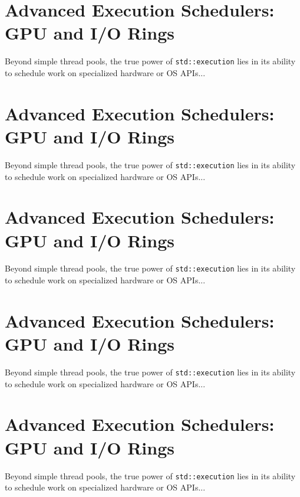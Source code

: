 \section{Advanced Execution Schedulers: GPU and I/O Rings}
Beyond simple thread pools, the true power of \texttt{std::execution} lies in its ability to schedule work on specialized hardware or OS APIs...

\section{Advanced Execution Schedulers: GPU and I/O Rings}
Beyond simple thread pools, the true power of \texttt{std::execution} lies in its ability to schedule work on specialized hardware or OS APIs...

\section{Advanced Execution Schedulers: GPU and I/O Rings}
Beyond simple thread pools, the true power of \texttt{std::execution} lies in its ability to schedule work on specialized hardware or OS APIs...

\section{Advanced Execution Schedulers: GPU and I/O Rings}
Beyond simple thread pools, the true power of \texttt{std::execution} lies in its ability to schedule work on specialized hardware or OS APIs...

\section{Advanced Execution Schedulers: GPU and I/O Rings}
Beyond simple thread pools, the true power of \texttt{std::execution} lies in its ability to schedule work on specialized hardware or OS APIs...
